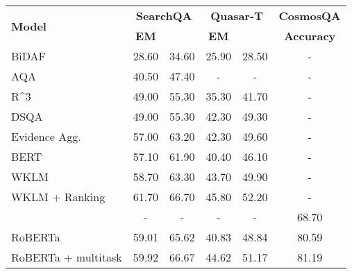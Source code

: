 \documentclass[11pt,a4paper]{article}
\begin{document}
\begin{table*}[!t]
\begin{center}
\begin{small}
\begin{tabular}{@{}l|cc|cc|c@{}}
\toprule
\multirow{2}{*}{\textbf{Model}} & \multicolumn{2}{c|}{\textbf{SearchQA}} & \multicolumn{2}{c|}{\textbf{Quasar-T}} & \textbf{CosmosQA} \\ \cmidrule(l){2-6} 
                                         & \textbf{EM}    & \textbf{}    & \textbf{EM}    & \textbf{}    & \textbf{Accuracy} \\ \midrule
BiDAF \citep{Seo2016BidirectionalAF}                 & 28.60          & 34.60          & 25.90          & 28.50          & -                 \\
AQA \citep{Buck2017AskTR}                  & 40.50          & 47.40          & -              & -              & -                 \\
R\textasciicircum{}3 \citep{wang2017reinforced} & 49.00          & 55.30          & 35.30          & 41.70          & -                 \\
DSQA \citep{lin2018denoising}                  & 49.00          & 55.30          & 42.30          & 49.30          & -                 \\
Evidence Agg. \citep{wang2017evidence}        & 57.00          & 63.20          & 42.30          & 49.60          & -                 \\
BERT \citep{xiong2019pretrained}                & 57.10          & 61.90          & 40.40          & 46.10          & -                 \\
WKLM \citep{xiong2019pretrained}                & 58.70          & 63.30          & 43.70          & 49.90          & -                 \\
WKLM + Ranking \citep{xiong2019pretrained}       & 61.70          & 66.70          & 45.80          & 52.20          & -                 \\ \midrule
 \citep{huang2019cosmos}                                  & -              & -              & -              & -              & 68.70             \\ \midrule
RoBERTa                                  & 59.01          & 65.62          & 40.83          & 48.84          & 80.59             \\
RoBERTa + multitask                      & 59.92              & 66.67              & 44.62              & 51.17              & 81.19             \\


\end{tabular}
\end{small}
\end{center}
\end{table*}
\end{document}
